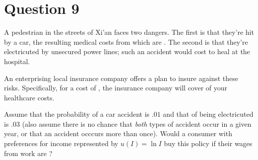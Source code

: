 \documentclass{article}
\begin{document}
\section*{Question 9}
A pedestrian in the streets of Xi'an faces two dangers. The first is that they're hit by a car, the resulting medical costs from which are . The second is that they're electricuted by unsecured power lines; such an accident would cost  to heal at the hospital.

An enterprising local insurance company offers a plan to insure against these risks. Specifically, for a cost of , the insurance company will cover  of your healthcare costs.

Assume that the probability of a car accident is $.01$ and that of being electricuted is $.03$ (also assume there is no chance that \textit{both} types of accident occur in a given year, or that an accident occcurs more than once). Would a consumer with preferences for income represented by $u(I) = \ln I$ buy this policy if their wages from work are ?
\end{document}
